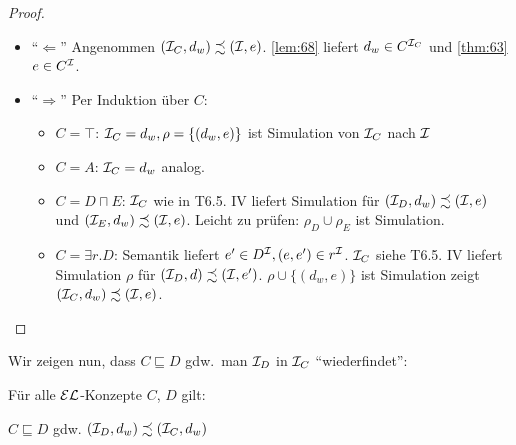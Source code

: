 \begin{tafel}
    \begin{proof}\mbox{}
        \begin{itemize}
            \item \enquote{$\Leftarrow$} Angenommen $(\mathcal{I}_C, d_w) \precsim (\mathcal{I}, e)$. \autoref{lem:68} liefert $d_w \in C^{\mathcal{I}_C}$ und \autoref{thm:63} $e \in C^{\mathcal{I}}$.
            \item \enquote{$\Rightarrow$} Per Induktion über $C$:
                \begin{itemize}
                    \item $C = \top$: $\mathcal{I}_C = d_w, \rho = \{(d_w, e)\}$ ist Simulation von $\mathcal{I}_C$ nach $\mathcal{I}$
                    \item $C = A$: $\mathcal{I}_C = d_w$ analog.
                    \item $C = D \sqcap E$: $\mathcal{I}_C$ wie in T6.5. IV liefert Simulation für $(\mathcal{I}_D, d_w) \precsim (\mathcal{I}, e)$ und $(\mathcal{I}_E, d_w) \precsim (\mathcal{I}, e)$. Leicht zu prüfen: $\rho_D \cup \rho_E$ ist Simulation.
                    \item $C = \exists r.D$: Semantik liefert $e' \in D^{\mathcal{I}}, (e, e') \in r^{\mathcal{I}}$. $\mathcal{I}_C$ siehe T6.5. IV liefert Simulation $\rho$ für $(\mathcal{I}_D, d) \precsim (\mathcal{I}, e')$. $\rho \cup \{(d_w, e)\}$ ist Simulation zeigt $(\mathcal{I}_C, d_w) \precsim (\mathcal{I}, e)$.
                \end{itemize}
        \end{itemize}

    \end{proof}
\end{tafel}

Wir zeigen nun, dass $C \sqsubseteq D$ gdw.\ man $\mathcal{I}_D$ in $\mathcal{I}_C$ \enquote{wiederfindet}:

\begin{lemma}
Für alle $\mathcal{E}\mathcal{L}$-Konzepte $C$, $D$ gilt:
\begin{center}
$C \sqsubseteq D$ gdw.
$\left( \MI_D,d_w \right) \precsim \left( \MI_C,d_w \right)$
\end{center}
\end{lemma}

